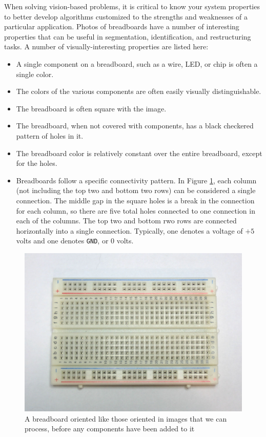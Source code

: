 \documentclass[10pt,twocolumn,letterpaper]{article}
\begin{document}
When solving vision-based problems, it is critical to know your system
properties to better develop algorithms customized to the strengths and
weaknesses of a particular application. Photos of breadboards have a number of
interesting properties that can be useful in segmentation, identification, and
restructuring tasks. A number of visually-interesting properties are listed here:
\begin{itemize}
\item A single component on a breadboard, such as a wire, LED, or chip is often a single color. 
\item The colors of the various components are often easily visually distinguishable. 
\item The breadboard is often square with the image. 
\item The breadboard, when not covered with components, has a black checkered pattern of holes in it. 
\item The breadboard color is relatively constant over the entire breadboard, except for the holes.
\item Breadboards follow a specific connectivity pattern. In Figure \ref{fig:board}, each column (not including the top two and bottom two rows) can be considered a single connection. The middle gap in the square holes is a break in the connection for each column, so there are five total holes connected to one connection in each of the columns. The top two and bottom rwo rows are connected horizontally into a single connection. Typically, one denotes a voltage of $+5$ volts and one denotes \verb|GND|, or $0$ volts. 
\end{itemize}

\begin{figure}[t]
\begin{center}
   \includegraphics[width=0.8\linewidth]{imgs/breadboard.jpg}
\end{center}
   \caption{A breadboard oriented like those oriented in images that
     we can process, before any components have been added to it}
\label{fig:board}
\end{figure}
\end{document}
